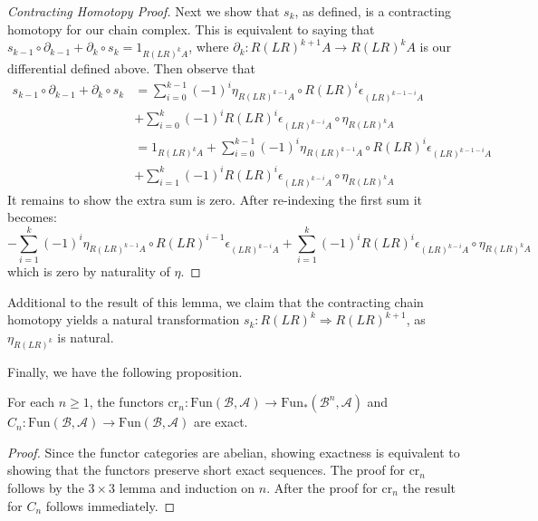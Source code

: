 \begin{proof}[Contracting Homotopy Proof]
    Next we show that $s_k$, as defined, is a contracting homotopy for our chain complex. This is equivalent to saying that $s_{k-1}\circ \partial_{k-1}+\partial_{k}\circ s_{k} = 1_{R(LR)^kA}$, where $\partial_k:R(LR)^{k+1}A\rightarrow R(LR)^kA$ is our differential defined above. Then observe that
    \begin{align*}
        s_{k-1}\circ \partial_{k-1}+\partial_{k}\circ s_{k} &= \sum_{i=0}^{k-1}(-1)^i\eta_{R(LR)^{k-1}A}\circ R(LR)^i\epsilon_{(LR)^{k-1-i}A} \\
        &+ \sum_{i=0}^k(-1)^iR(LR)^i\epsilon_{(LR)^{k-i}A}\circ \eta_{R(LR)^kA} \\
        &= 1_{R(LR)^kA}+\sum_{i=0}^{k-1}(-1)^i\eta_{R(LR)^{k-1}A}\circ R(LR)^i\epsilon_{(LR)^{k-1-i}A} \\
        &+ \sum_{i=1}^k(-1)^iR(LR)^i\epsilon_{(LR)^{k-i}A}\circ \eta_{R(LR)^kA} \tag{using the triangle identities} 
    \end{align*}
    It remains to show the extra sum is zero. After re-indexing the first sum it becomes:
    \begin{equation*}
        -\sum_{i=1}^{k}(-1)^i\eta_{R(LR)^{k-1}A}\circ R(LR)^{i-1}\epsilon_{(LR)^{k-i}A} + \sum_{i=1}^k(-1)^iR(LR)^i\epsilon_{(LR)^{k-i}A}\circ \eta_{R(LR)^kA}
    \end{equation*}
    which is zero by naturality of $\eta$.
\end{proof}

Additional to the result of this lemma, we claim that the contracting chain homotopy yields a natural transformation $s_k:R(LR)^k\Rightarrow R(LR)^{k+1}$, as $\eta_{R(LR)^k}$ is natural.

Finally, we have the following proposition.

\begin{prop}[label=prop:exactCross]
    For each $n \geq 1$, the functors $\text{cr}_n:\text{Fun}(\mathcal{B},\mathcal{A})\rightarrow \text{Fun}_*(\mathcal{B}^n,\mathcal{A})$ and $C_n:\text{Fun}(\mathcal{B},\mathcal{A})\rightarrow \text{Fun}(\mathcal{B},\mathcal{A})$ are exact.
\end{prop}
\begin{proof}
    Since the functor categories are abelian, showing exactness is equivalent to showing that the functors preserve short exact sequences. The proof for $\text{cr}_n$ follows by the $3\times 3$ lemma and induction on $n$. After the proof for $\text{cr}_n$ the result for $C_n$ follows immediately.
\end{proof}